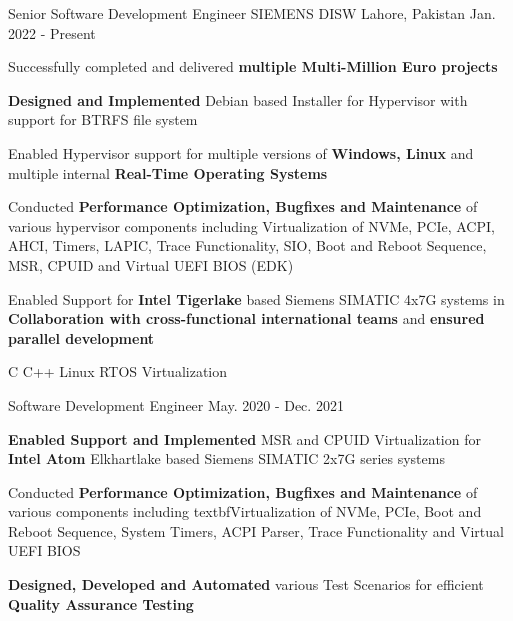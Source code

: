 

\begin{cventries}

  \cventry
    {Senior Software Development Engineer} %
    {SIEMENS DISW} %
    {Lahore, Pakistan} %
    {Jan. 2022 - Present} %
    {
      \begin{cvitems} %
        \item Successfully completed and delivered \textbf{multiple Multi-Million Euro projects}
        \item \textbf{Designed and Implemented} Debian based Installer for Hypervisor with support for BTRFS file system
        \item Enabled Hypervisor support for multiple versions of \textbf{Windows, Linux} and multiple internal \textbf{Real-Time Operating Systems}
        \item Conducted \textbf{Performance Optimization, Bugfixes and Maintenance} of various hypervisor components including Virtualization of NVMe, PCIe, ACPI, AHCI, Timers, LAPIC, Trace Functionality, SIO, Boot and Reboot Sequence, MSR, CPUID and Virtual UEFI BIOS (EDK)
        \item Enabled Support for \textbf{Intel Tigerlake} based Siemens SIMATIC 4x7G systems in \textbf{Collaboration with cross-functional international teams} and \textbf{ensured parallel development}
      \end{cvitems}
    }
    {C \acvSep C++ \acvSep Linux \acvSep RTOS \acvSep Virtualization}

  \cventry
    {Software Development Engineer} %
    {} %
    {} %
    {May. 2020 - Dec. 2021} %
    {
      \begin{cvitems} %
        \item \textbf{Enabled Support and Implemented} MSR and CPUID Virtualization for \textbf{Intel Atom} Elkhartlake based Siemens SIMATIC 2x7G series systems
        \item Conducted \textbf{Performance Optimization, Bugfixes and Maintenance} of various components including textbf{Virtualization} of NVMe, PCIe, Boot and Reboot Sequence, System Timers, ACPI Parser, Trace Functionality and Virtual UEFI BIOS
        \item \textbf{Designed, Developed and Automated} various Test Scenarios for efficient \textbf{Quality Assurance Testing}
      \end{cvitems}
    }
    {}%


\end{cventries}
